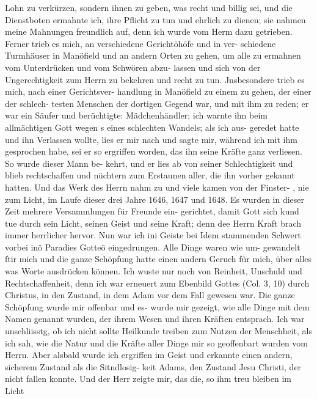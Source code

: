 Lohn zu verkürzen, sondern ihnen zu geben, was recht und billig
sei, und die Dienstboten ermahnte ich, ihre Pflicht zu tun und
ehrlich zu dienen; sie nahmen meine Mahnungen freundlich auf,
denn ich wurde vom Herm dazu getrieben.
Ferner trieb es mich, an verschiedene Gerichtöhöfe und in ver-
schiedene Turmhäuser in Manöfield und an andern Orten zu gehen,
um alle zu ermahnen vom Unterdrücken und vom Schwören abzu-
lassen und sich von der Ungerechtigkeit zum Herrn zu bekehren und
recht zu tun. Jnsbesondere trieb es mich, nach einer Gerichtsver-
handlung in Manöfield zu einem zu gehen, der einer der schlech-
testen Menschen der dortigen Gegend war, und mit ihm zu reden;
er war ein Säufer und berüchtigte: Mädchenhändler; ich warnte ihn
beim allmächtigen Gott wegen s eines schlechten Wandels; als ich aus-
geredet hatte und ihn Verlassen wollte, lies er mir nach und sagte
mir, während ich mit ihm gesprochen habe, sei er so ergriffen worden,
das ihn seine Kräfte ganz verliesen. So wurde dieser Mann be-
kehrt, und er lies ab von seiner Schlechtigkeit und blieb rechtschaffen
und nüchtern zum Erstaunen aller, die ihn vorher gekannt hatten.
Und das Werk des Herrn nahm zu und viele kamen von der Finster- ,
nie zum Licht, im Laufe dieser drei Jahre 1646, 1647 und 1648.
Es wurden in dieser Zeit mehrere Versammlungen für Freunde ein-
gerichtet, damit Gott sich kund tue durch sein Licht, seinen Geist
und seine Kraft; denn dee Herrn Kraft brach immer herrlicher hervor.
Nun war ich ini Geiste bei Idem stammenden Schwert vorbei
inö Paradies Gotteö eingedrungen. Alle Dinge waren wie um-
gewandelt ftir mich und die ganze Schöpfung hatte einen andern
Geruch für mich, über alles was Worte ausdrücken können. Ich
wuste nur noch von Reinheit, Unschuld und Rechtschaffenheit, denn
ich war erneuert zum Ebenbild Gottes (Col. 3, 10) durch Christus,
in den Zustand, in dem Adam vor dem Fall gewesen war. Die
ganze Schöpfung wurde mir offenbar und es- wurde mir gezeigt,
wie alle Dinge mit dem Namen genannt wurden, der ihrem
Wesen und ihren Kräften entsprach. Ich war unschliisstg, ob ich
nicht sollte Heilkunde treiben zum Nutzen der Menschheit, als ich
sah, wie die Natur und die Kräfte aller Dinge mir so geoffenbart
wurden vom Herrn. Aber alsbald wurde ich ergriffen im Geist
und erkannte einen andern, sicherem Zustand als die Sitndlosig-
keit Adams, den Zustand Jesu Christi, der nicht fallen konnte.
Und der Herr zeigte mir, das die, so ihm treu bleiben im Licht


